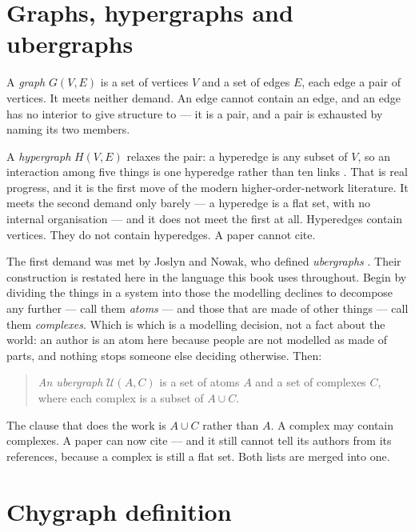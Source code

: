 \section{Graphs, hypergraphs and ubergraphs}

A \emph{graph} $G(V,E)$ is a set of vertices $V$ and a set of edges $E$, each
edge a pair of vertices. It meets neither demand. An edge cannot contain an
edge, and an edge has no interior to give structure to --- it is a pair, and a
pair is exhausted by naming its two members.

A \emph{hypergraph} $H(V,E)$ relaxes the pair: a hyperedge is any subset of $V$,
so an interaction among five things is one hyperedge rather than ten links
\citep{ghoshal2009,battiston2020}. That is real progress, and it is the first
move of the modern higher-order-network literature. It meets the second
demand only barely --- a hyperedge is a flat set, with no internal organisation
--- and it does not meet the first at all. Hyperedges contain vertices. They do
not contain hyperedges. A paper cannot cite.

The first demand was met by Joslyn and Nowak, who defined \emph{ubergraphs}
\citep{joslyn2017}. Their construction is restated here in the language this
book uses throughout. Begin by dividing the things in a system into those the
modelling declines to decompose any further --- call them \emph{atoms} ---
and those that are made of other things --- call them \emph{complexes}. Which is
which is a modelling decision, not a fact about the world: an author is an atom
here because people are not modelled as made of parts, and nothing
stops someone else deciding otherwise. Then:

\begin{quote}
\emph{An ubergraph} $\mathcal{U}(A,C)$ is a set of atoms $A$ and a set of
complexes $C$, where each complex is a subset of $A\cup C$.
\end{quote}

The clause that does the work is $A\cup C$ rather than $A$. A complex may
contain complexes. A paper can now cite --- and it still cannot tell its
authors from its references, because a complex is still a flat set. Both lists
are merged into one.

\section{Chygraph definition}
\label{sec:definition}

